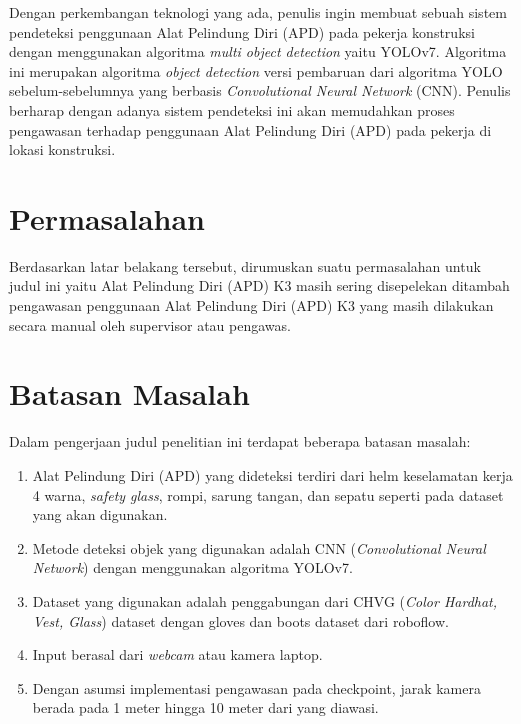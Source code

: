 Dengan perkembangan teknologi yang ada, penulis ingin membuat sebuah sistem pendeteksi penggunaan Alat Pelindung Diri (APD) pada pekerja konstruksi dengan menggunakan algoritma \textit{multi object detection} yaitu YOLOv7. Algoritma ini merupakan algoritma \textit{object detection} versi pembaruan dari algoritma YOLO sebelum-sebelumnya yang berbasis \textit{Convolutional Neural Network} (CNN). Penulis berharap dengan adanya sistem pendeteksi ini akan memudahkan proses pengawasan terhadap penggunaan Alat Pelindung Diri (APD) pada pekerja di lokasi konstruksi.

\newpage

\section{Permasalahan}

Berdasarkan latar belakang tersebut, dirumuskan suatu permasalahan untuk judul ini yaitu Alat Pelindung Diri (APD) K3 masih sering disepelekan ditambah pengawasan penggunaan Alat Pelindung Diri (APD) K3 yang masih dilakukan secara manual oleh supervisor atau pengawas.

\section{Batasan Masalah}

Dalam pengerjaan judul penelitian ini terdapat beberapa batasan masalah:
\begin{enumerate}[nolistsep]
    \item Alat Pelindung Diri (APD) yang dideteksi terdiri dari helm keselamatan kerja 4 warna, \textit{safety glass}, rompi, sarung tangan, dan sepatu seperti pada dataset yang akan digunakan.
    \item Metode deteksi objek yang digunakan adalah CNN (\emph{Convolutional Neural Network}) dengan menggunakan algoritma YOLOv7.
    \item Dataset yang digunakan adalah penggabungan dari CHVG (\textit{Color Hardhat, Vest, Glass}) dataset dengan gloves dan boots dataset dari roboflow.
    \item Input berasal dari \emph{webcam} atau kamera laptop.
    \item Dengan asumsi implementasi pengawasan pada checkpoint, jarak kamera berada pada 1 meter hingga 10 meter dari yang diawasi.
\end{enumerate}

